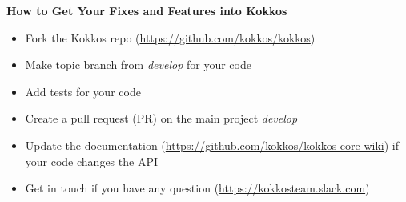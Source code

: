 









\begin{frame}[fragile]

  \vspace{10pt}

  \textbf{How to Get Your Fixes and Features into Kokkos}
  \newline
  \begin{itemize}
    \item Fork the Kokkos repo (\url{https://github.com/kokkos/kokkos})
    \item Make topic branch from \textit{develop} for your code
    \item Add tests for your code
    \item Create a pull request (PR) on the main project \textit{develop}
    \item Update the documentation (\url{https://github.com/kokkos/kokkos-core-wiki}) if your code changes the API
    \item Get in touch if you have any question (\url{https://kokkosteam.slack.com})
  \end{itemize}

\end{frame}



